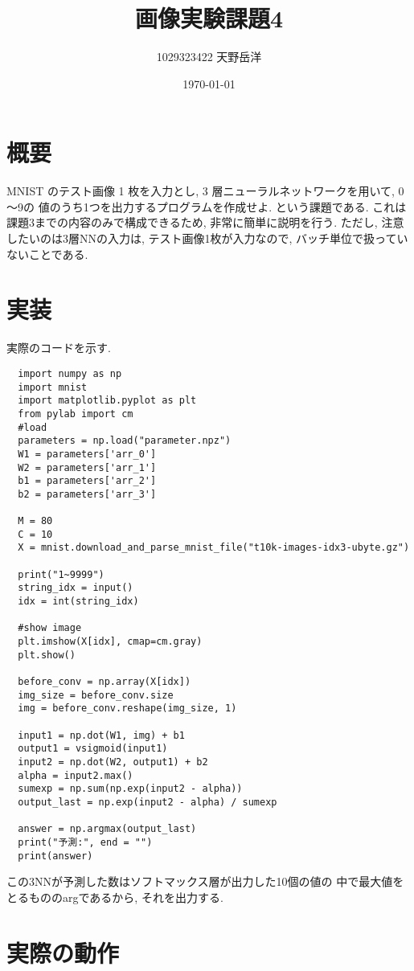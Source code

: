 \documentclass[a4paper,11pt]{jsarticle}
\begin{document}
\title{画像実験課題4}
\author{1029323422 天野岳洋}
\date{\today}
\maketitle
\clearpage

\section{概要}
MNIST のテスト画像 1 枚を入力とし, 3 層ニューラルネットワークを用いて, 0～9の
値のうち1つを出力するプログラムを作成せよ. という課題である.
これは課題3までの内容のみで構成できるため, 非常に簡単に説明を行う.
ただし, 注意したいのは3層NNの入力は, テスト画像1枚が入力なので, 
バッチ単位で扱っていないことである.
\section{実装}
実際のコードを示す.
\begin{lstlisting}
  import numpy as np
  import mnist
  import matplotlib.pyplot as plt
  from pylab import cm
  #load
  parameters = np.load("parameter.npz")
  W1 = parameters['arr_0']
  W2 = parameters['arr_1']
  b1 = parameters['arr_2']
  b2 = parameters['arr_3']

  M = 80
  C = 10
  X = mnist.download_and_parse_mnist_file("t10k-images-idx3-ubyte.gz")

  print("1~9999")
  string_idx = input()
  idx = int(string_idx)

  #show image
  plt.imshow(X[idx], cmap=cm.gray)
  plt.show()

  before_conv = np.array(X[idx])
  img_size = before_conv.size
  img = before_conv.reshape(img_size, 1)

  input1 = np.dot(W1, img) + b1
  output1 = vsigmoid(input1)
  input2 = np.dot(W2, output1) + b2
  alpha = input2.max()
  sumexp = np.sum(np.exp(input2 - alpha))
  output_last = np.exp(input2 - alpha) / sumexp

  answer = np.argmax(output_last)
  print("予測:", end = "")
  print(answer) 
\end{lstlisting}
この3NNが予測した数はソフトマックス層が出力した10個の値の
中で最大値をとるもののargであるから, それを出力する.

\section{実際の動作}
\end{document}

